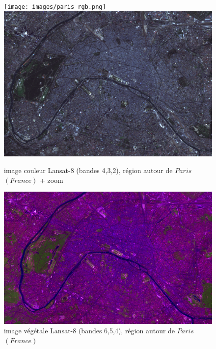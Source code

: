 \documentclass{book}
\begin{document}
\begin{figure}[H]
\begin{center}
\texttt{[image: images/paris\_rgb.png]}
\includegraphics[scale=0.5]{images/paris_rgb_zoom.png}
\end{center}
\caption{image couleur Lansat-8 (bandes 4,3,2), région autour de $Paris$ $(France)$ + zoom}
\label{color}
\end{figure}


\begin{figure}[H]
\begin{center}
\includegraphics[scale=0.3]{images/paris_vegetal_zoom_pansharpened.png}
\end{center}
\caption{image végétale Lansat-8 (bandes 6,5,4), région autour de $Paris$ $(France)$}
\label{vegetation}
\end{figure}

\clearpage
\end{document}
